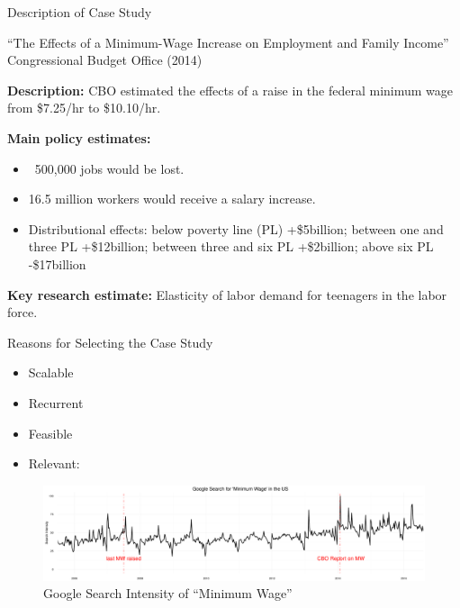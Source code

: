 \documentclass{beamer}
\begin{document}
\begin{frame}[label =  desc_cs]{Description of Case Study}
\begin{center}
``The Effects of a Minimum-Wage Increase on Employment and Family Income'' 
Congressional Budget Office (2014)
\end{center}

\textbf{Description:} CBO estimated the effects of a raise in the federal minimum wage from \$7.25/hr to \$10.10/hr. 


\textbf{Main policy estimates:}
\begin{itemize}
\item ~500,000 jobs would be lost.
\item 16.5 million workers would receive a salary increase. 
\item Distributional effects: below poverty line (PL) +\$5billion; between one and three PL +\$12billion; between three and six PL +\$2billion; above six PL -\$17billion
\end{itemize}

\textbf{Key research estimate:} Elasticity of labor demand for teenagers in the labor force. 
\end{frame}


\begin{frame}{Reasons for Selecting the Case Study}
    \begin{multicols}{2}
    \begin{itemize}
        \item Scalable
        \item Recurrent
        \item Feasible
        \item Relevant:
    \end{itemize}
    \end{multicols}
\begin{figure}[h!]
\centering
\vspace*{-1em}
\hspace*{-1.7em}
\includegraphics[scale = 0.22]{../Images/min_wage_gtrend}
\vspace*{-0.8em}
\caption{Google Search Intensity of ``Minimum Wage''}
\label{mw_gtrend}
\end{figure}	
\end{frame}
\end{document}
